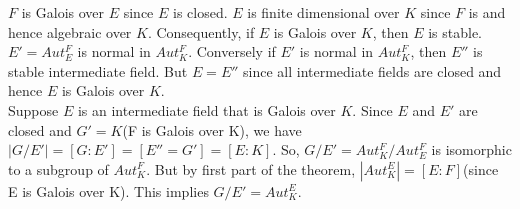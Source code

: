         \(F\) is Galois over \(E\) since \(E\) is closed. \(E\) is finite dimensional over \(K\) since \(F\) is and hence algebraic over \(K\). Consequently, if \(E\) is Galois over \(K\), then \(E\) is stable.
        \(E'=Aut_E^F\) is normal in \(Aut_K^F\). Conversely if \(E'\) is normal in \(Aut_K^F\), then \(E''\) is stable intermediate field. But \(E=E''\) since all intermediate fields are closed and hence \(E\) is Galois over \(K\).\\[2mm]

        Suppose \(E\) is an intermediate field that is Galois over \(K\). Since \(E\) and \(E'\) are closed and \(G'=K\)(F is Galois over K), we have \(|G/E'|=[G:E']=[E''=G']=[E:K]\). So, \(G/E'=Aut_K^F/Aut_E^F\) is isomorphic to a subgroup of \(Aut_K^F\). But by first part of the theorem, \(|Aut_K^E|=[E:F]\)(since E is Galois over K). This implies \(G/E'=Aut_K^E\).




